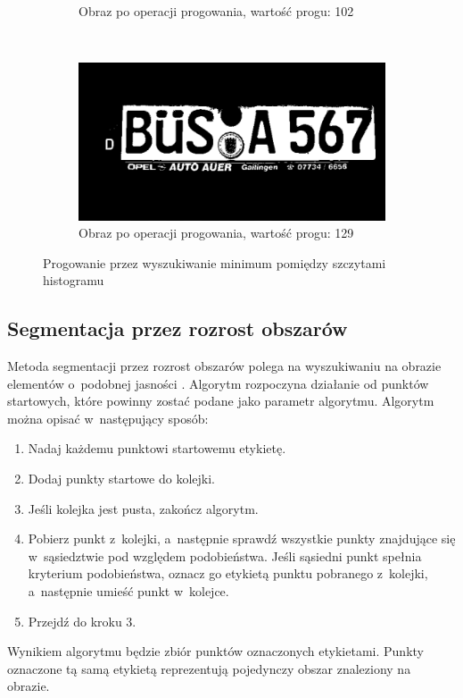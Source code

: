 \begin{figure}
\begin{subfigure}[b]{0.45\textwidth}
    \caption{Obraz po operacji progowania, wartość progu: 102}
    \label{fig:histogram_valleys_bad}
  \end{subfigure}
  ~
  \begin{subfigure}[b]{0.45\textwidth}
    \includegraphics[width=\textwidth]{img/histogram-valleys-good}
    \caption{Obraz po operacji progowania, wartość progu: 129}
    \label{fig:hitogram_valleys_good}
  \end{subfigure}
  \caption{Progowanie przez wyszukiwanie minimum pomiędzy szczytami histogramu}\label{fig:histogram_valleys}
\end{figure}
\subsection{Segmentacja przez rozrost obszarów}
Metoda segmentacji przez rozrost obszarów polega na wyszukiwaniu na obrazie elementów o~podobnej jasności \cite{ballard82}. Algorytm rozpoczyna działanie od punktów startowych, które powinny zostać podane jako parametr algorytmu. Algorytm można opisać w~następujący sposób:
\begin{enumerate}
  \item Nadaj każdemu punktowi startowemu etykietę.
  \item Dodaj punkty startowe do kolejki.
  \item Jeśli kolejka jest pusta, zakończ algorytm.
  \item Pobierz punkt z~kolejki, a~następnie sprawdź wszystkie punkty znajdujące się w~sąsiedztwie pod względem podobieństwa. Jeśli sąsiedni punkt spełnia kryterium podobieństwa, oznacz go etykietą punktu pobranego z~kolejki, a~następnie umieść punkt w~kolejce.
  \item Przejdź do kroku 3.
\end{enumerate}
Wynikiem algorytmu będzie zbiór punktów oznaczonych etykietami. Punkty oznaczone tą samą etykietą reprezentują pojedynczy obszar znaleziony na obrazie.

